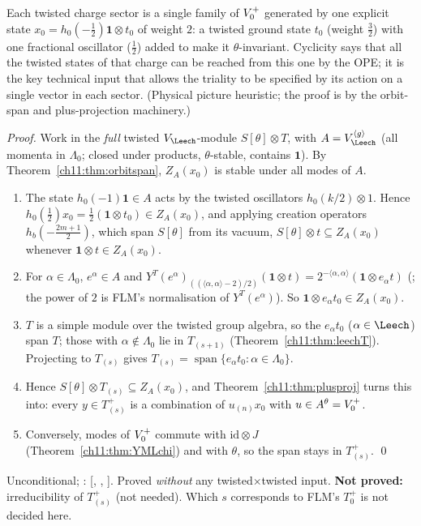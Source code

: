 \begin{physics}
Each twisted charge sector is a single family of $V_0^{+}$ generated by one explicit state $x_0=h_0(-\tfrac12)\mathbf 1\otimes t_0$ of weight $2$: a twisted ground state $t_0$ (weight $\tfrac32$) with one fractional oscillator ($\tfrac12$) added to make it $\theta$-invariant. Cyclicity says that all the twisted states of that charge can be reached from this one by the OPE; it is the key technical input that allows the triality to be specified by its action on a single vector in each sector. (Physical picture heuristic; the proof is by the orbit-span and plus-projection machinery.)
\end{physics}
\emph{Proof.}  Work in the \emph{full} twisted $V_\Leech$-module $S[\theta]\otimes T$, with
$A=V_\Leech^{\langle g\rangle}$ (all momenta in $\Lambda_0$; closed under products, $\theta$-stable,
contains $\mathbf 1$).  By Theorem~\ref{ch11:thm:orbitspan}, $Z_A(x_0)$ is stable under all modes of
$A$.
\begin{enumerate}
  \item The state $h_0(-1)\mathbf 1\in A$ acts by the twisted oscillators $h_0(k/2)\otimes1$.  Hence
  $h_0(\tfrac12)x_0=\tfrac12(\mathbf 1\otimes t_0)\in Z_A(x_0)$, and applying creation operators
  $h_b(-\tfrac{2m+1}{2})$, which span $S[\theta]$ from its vacuum, $S[\theta]\otimes t\subseteq Z_A(x_0)$
  whenever $\mathbf 1\otimes t\in Z_A(x_0)$.
  \item For $\alpha\in\Lambda_0$, $e^\alpha\in A$ and $Y^T(e^\alpha)_{((\langle\alpha,\alpha\rangle-2)/2)}
  (\mathbf 1\otimes t)=2^{-\langle\alpha,\alpha\rangle}(\mathbf 1\otimes e_\alpha t)$
  (; the power of $2$ is FLM's normalisation of $Y^T(e^\alpha)$).
  So $\mathbf 1\otimes e_\alpha t_0\in Z_A(x_0)$.
  \item $T$ is a simple module over the twisted group algebra, so the $e_\alpha t_0$ ($\alpha\in\Leech$)
  span $T$; those with $\alpha\notin\Lambda_0$ lie in $T_{(s+1)}$ (Theorem~\ref{ch11:thm:leechT}).
  Projecting to $T_{(s)}$ gives $T_{(s)}=\operatorname{span}\{e_\alpha t_0:\alpha\in\Lambda_0\}$.
  \item Hence $S[\theta]\otimes T_{(s)}\subseteq Z_A(x_0)$, and Theorem~\ref{ch11:thm:plusproj} turns
  this into: every $y\in T^+_{(s)}$ is a combination of $u_{(n)}x_0$ with $u\in A^\theta=V_0^{+}$.
  \item Conversely, modes of $V_0^{+}$ commute with $\mathrm{id}\otimes J$
  (Theorem~\ref{ch11:thm:YMLchi}) and with $\theta$, so the span stays in $T^+_{(s)}$. \qed
\end{enumerate}
\begin{status}Unconditional; : [,
, ].  Proved \emph{without} any twisted$\times$twisted input.
\textbf{Not proved:} irreducibility of $T^+_{(s)}$ (not needed).  Which $s$ corresponds to FLM's
$T_0^+$ is not decided here.\end{status}

